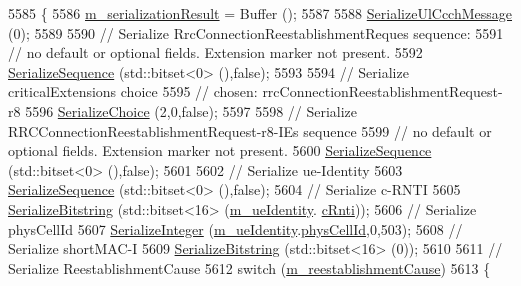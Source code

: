 \begin{DoxyCode}
5585 \{
5586   \hyperlink{classns3_1_1Asn1Header_a758b74023ea5bf40941af6f0a6a66058}{m\_serializationResult} = Buffer ();
5587 
5588   \hyperlink{classns3_1_1RrcUlCcchMessage_ac6f5ee6f826d83661b2cab01dcd78d5c}{SerializeUlCcchMessage} (0);
5589 
5590   \textcolor{comment}{// Serialize RrcConnectionReestablishmentReques sequence:}
5591   \textcolor{comment}{// no default or optional fields. Extension marker not present.}
5592   \hyperlink{classns3_1_1Asn1Header_aa9744858380443ed95836fed08799aed}{SerializeSequence} (std::bitset<0> (),\textcolor{keyword}{false});
5593 
5594   \textcolor{comment}{// Serialize criticalExtensions choice}
5595   \textcolor{comment}{// chosen: rrcConnectionReestablishmentRequest-r8}
5596   \hyperlink{classns3_1_1Asn1Header_a400ef4a710499da80fc55e23a973d4fa}{SerializeChoice} (2,0,\textcolor{keyword}{false});
5597 
5598   \textcolor{comment}{// Serialize RRCConnectionReestablishmentRequest-r8-IEs sequence}
5599   \textcolor{comment}{// no default or optional fields. Extension marker not present.}
5600   \hyperlink{classns3_1_1Asn1Header_aa9744858380443ed95836fed08799aed}{SerializeSequence} (std::bitset<0> (),\textcolor{keyword}{false});
5601 
5602   \textcolor{comment}{// Serialize ue-Identity}
5603   \hyperlink{classns3_1_1Asn1Header_aa9744858380443ed95836fed08799aed}{SerializeSequence} (std::bitset<0> (),\textcolor{keyword}{false});
5604   \textcolor{comment}{// Serialize c-RNTI}
5605   \hyperlink{classns3_1_1Asn1Header_a0be8d507b87be07f85f35b906f8e5da7}{SerializeBitstring} (std::bitset<16> (\hyperlink{classns3_1_1RrcConnectionReestablishmentRequestHeader_a35a87c6767d3bd47ef67688a98157bae}{m\_ueIdentity}.
      \hyperlink{structns3_1_1LteRrcSap_1_1ReestabUeIdentity_aa5bbd6336e92bf028cb8841e6669f9e6}{cRnti}));
5606   \textcolor{comment}{// Serialize physCellId}
5607   \hyperlink{classns3_1_1Asn1Header_ab1c3bd37730affa7473bc759d625c29a}{SerializeInteger} (\hyperlink{classns3_1_1RrcConnectionReestablishmentRequestHeader_a35a87c6767d3bd47ef67688a98157bae}{m\_ueIdentity}.\hyperlink{structns3_1_1LteRrcSap_1_1ReestabUeIdentity_a90790c6986fc2f29df81220832eb4834}{physCellId},0,503);
5608   \textcolor{comment}{// Serialize shortMAC-I}
5609   \hyperlink{classns3_1_1Asn1Header_a0be8d507b87be07f85f35b906f8e5da7}{SerializeBitstring} (std::bitset<16> (0));
5610 
5611   \textcolor{comment}{// Serialize ReestablishmentCause}
5612   \textcolor{keywordflow}{switch} (\hyperlink{classns3_1_1RrcConnectionReestablishmentRequestHeader_a11c01646910bd88dcd441cde3532fd5a}{m\_reestablishmentCause})
5613     \{

\end{DoxyCode}
